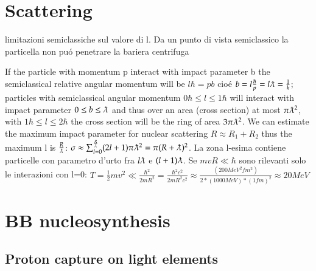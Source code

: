 \documentclass[main.tex]{subfiles}
\begin{document}
\chapter{Scattering}
\PartialToc

limitazioni semiclassiche sul valore di l.
Da un punto di vista semiclassico la particella non pu\'o penetrare la bariera centrifuga
If the particle with momentum p interact with impact parameter b the semiclassical relative angular momentum will be $l\hbar=pb$ cio\'e $b=l\frac{\hbar}{p}=l\lambdabar=\frac{1}{k}$; particles with semiclassical angular momentum $0\hbar\leq l\leq1 \hbar$  will interact with impact parameter $0\leq b\leq \lambdabar$ and thus over an area (cross section) at most $\pi\lambdabar^2$, with $1\hbar\leq l\leq2\hbar$ the cross section will be the ring of area $3\pi\lambdabar^2$. We can estimate the maximum impact parameter for nuclear scattering $R\approx R_1+R_2$ thus the maximum l is $\frac{R}{\lambdabar}$: $\sigma\approx\sum_{l=0}^{\frac{R}{\lambdabar}}(2l+1)\pi\lambdabar^2=\pi(R+\lambdabar)^2$.
La zona l-esima contiene particelle con parametro d'urto fra $l\lambdabar$ e $(l+1)\lambdabar$. Se $mvR\ll\hbar$ sono rilevanti solo le interazioni con l=0: $T=\frac{1}{2}mv^2\ll\frac{\hbar^2}{2mR^2}=\frac{\hbar^2c^2}{2mR^2c^2}\approx\frac{(200 MeV^2 fm^2)}{2*(1000 MeV) *(1 fm)^2}\approx 20 MeV$

\chapter{BB nucleosynthesis}
\PartialToc

\section{Proton capture on light elements}
\end{document}
